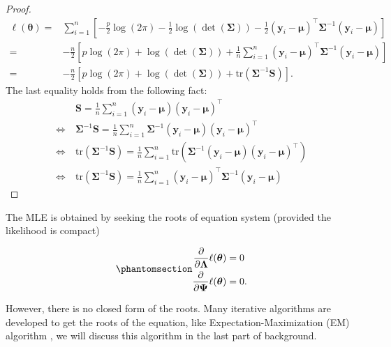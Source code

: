 \documentclass[
  a4paper,
  oneside,
  openany,
  12pt,
  onecolumn,
  twoside]{book}
\theoremstyle{plain}
\theoremstyle{remark}
\begin{document}
\begin{proof}
\[
\begin{align*}
\ell(\boldsymbol{\theta})=& \sum^n_{i=1}\left[-\frac{p}{2}\log(2\pi)-\frac{1}{2}\log(\det(\boldsymbol{\Sigma}))-\frac{1}{2}(\boldsymbol{y}_i-\boldsymbol{\mu})^\top\boldsymbol{\Sigma}^{-1}(\boldsymbol{y}_i-\boldsymbol{\mu})\right]\\
=& -\frac{n}{2}\left[p\log(2\pi)+\log(\det(\boldsymbol{\Sigma}))+\frac{1}{n}\sum_{i=1}^n(\boldsymbol{y}_i-\boldsymbol{\mu})^\top\boldsymbol{\Sigma}^{-1}(\boldsymbol{y}_i-\boldsymbol{\mu})\right]\\
=& -\frac{n}{2}\left[p\log(2\pi)+\log(\det(\boldsymbol{\Sigma}))+\text{tr}(\boldsymbol{\Sigma}^{-1}\boldsymbol{S})\right].
\end{align*}
\] The last equality holds from the following fact: \[
\begin{align*}
&\boldsymbol{S}=\frac{1}{n}\sum^n_{i=1}(\boldsymbol{y}_i-\boldsymbol{\mu})(\boldsymbol{y}_i-\boldsymbol{\mu})^\top\\
\Leftrightarrow \ & \boldsymbol{\Sigma}^{-1}\boldsymbol{S}=\frac{1}{n}\sum^n_{i=1}\boldsymbol{\Sigma}^{-1}(\boldsymbol{y}_i-\boldsymbol{\mu})(\boldsymbol{y}_i-\boldsymbol{\mu})^\top\\
\Leftrightarrow \ & \text{tr}(\boldsymbol{\Sigma}^{-1}\boldsymbol{S}) = \frac{1}{n} \sum^n_{i=1} \text{tr} (\boldsymbol{\Sigma}^{-1}(\boldsymbol{y}_i-\boldsymbol{\mu})(\boldsymbol{y}_i-\boldsymbol{\mu})^\top)\\
\Leftrightarrow \ & \text{tr}(\boldsymbol{\Sigma}^{-1}\boldsymbol{S}) = \frac{1}{n}\sum_{i=1}^n(\boldsymbol{y}_i-\boldsymbol{\mu})^\top\boldsymbol{\Sigma}^{-1}(\boldsymbol{y}_i-\boldsymbol{\mu})
\end{align*}
\]
\end{proof}

The MLE is obtained by seeking the roots of equation system (provided
the likelihood is compact)

\begin{equation}\phantomsection\label{eq-solveMLE}{
\begin{align*}
\frac{\partial}{\partial \boldsymbol{\Lambda}}\ell(\boldsymbol{\theta})&=0 \\
\frac{\partial}{\partial \boldsymbol{\Psi}}\ell(\boldsymbol{\theta})&= 0.
\end{align*}
}\end{equation}

However, there is no closed form of the roots. Many iterative algorithms
are developed to get the roots of the equation, like
Expectation-Maximization (EM) algorithm \citep{Rubin1982EMAlgorithms},
we will discuss this algorithm in the last part of background.
\end{document}

